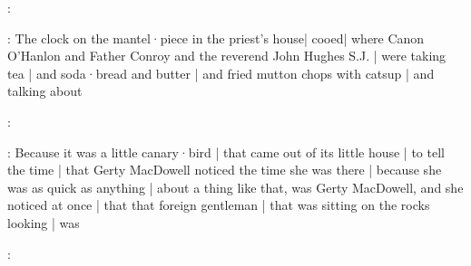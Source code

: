 :

\Nrelig:
The clock on the mantel·piece in the priest's house| 
cooed| 
where Canon O'Hanlon
and Father Conroy
and the reverend John Hughes S.J. | 
were taking tea |
and soda·bread and butter |
and fried mutton chops with catsup |
and talking about

:

:
Because it was a little canary·bird |
that came out of its little house |
to tell the time |
that Gerty MacDowell noticed the time she was there |%
because she was as quick as anything |
about a thing like that,
was Gerty MacDowell,
and she noticed at once |
that that foreign gentleman |
that was sitting on the rocks looking |
was

:

